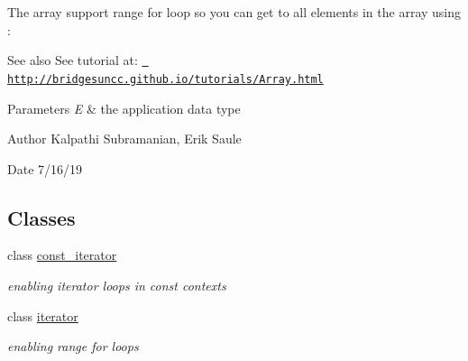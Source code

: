\begin{DoxyCode}{0}
\end{DoxyCode}


The array support range for loop so you can get to all elements in the array using \+:


\begin{DoxyCode}{0}
\DoxyCodeLine{\}}
\end{DoxyCode}


\begin{DoxySeeAlso}{See also}
See tutorial at\+: \href{http://bridgesuncc.github.io/tutorials/Array.html}{\texttt{ http\+://bridgesuncc.\+github.\+io/tutorials/\+Array.\+html}}
\end{DoxySeeAlso}

\begin{DoxyParams}{Parameters}
{\em E} & the application data type \\
\hline
\end{DoxyParams}
\begin{DoxyAuthor}{Author}
Kalpathi Subramanian, Erik Saule 
\end{DoxyAuthor}
\begin{DoxyDate}{Date}
7/16/19 
\end{DoxyDate}
\subsection*{Classes}
\begin{DoxyCompactItemize}
\item 
class \mbox{\hyperlink{classbridges_1_1datastructure_1_1_array1_d_1_1const__iterator}{const\+\_\+iterator}}
\begin{DoxyCompactList}\small\item\em enabling iterator loops in const contexts \end{DoxyCompactList}\item 
class \mbox{\hyperlink{classbridges_1_1datastructure_1_1_array1_d_1_1iterator}{iterator}}
\begin{DoxyCompactList}\small\item\em enabling range for loops \end{DoxyCompactList}\end{DoxyCompactItemize}
